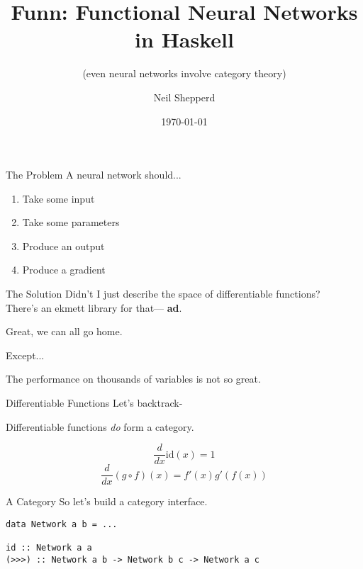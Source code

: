 \documentclass[10pt]{beamer}
\title{Funn: Functional Neural Networks in Haskell}
\subtitle{(even neural networks involve category theory)}
\date{\today}
\author{Neil Shepperd}
\begin{document}
\maketitle


\begin{frame}{The Problem}
  A neural network should...
  \pause
  \begin{enumerate}
  \item Take some input \pause
  \item Take some parameters \pause
  \item Produce an output \pause
  \item Produce a gradient
  \end{enumerate}
\end{frame}

\begin{frame}{The Solution}
  Didn't I just describe the space of differentiable functions? \\
  There's an ekmett library for that\texttrademark \pause --- \textbf{ad}.

  Great, we can all go home.

  Except...
  \pause

  The performance on thousands of variables is not so great.
\end{frame}

\begin{frame}{Differentiable Functions}
  Let's backtrack-

  Differentiable functions \emph{do} form a category.

  \[ \frac{d}{dx} \text{id}(x) = 1 \]
  \[ \frac{d}{dx} (g \circ f)(x) = f'(x) g'(f(x)) \]
\end{frame}

\begin{frame}[fragile]{A Category}
  So let's build a category interface.

  \begin{verbatim}
data Network a b = ...

id :: Network a a
(>>>) :: Network a b -> Network b c -> Network a c
  \end{verbatim}
\end{frame}
\end{document}
